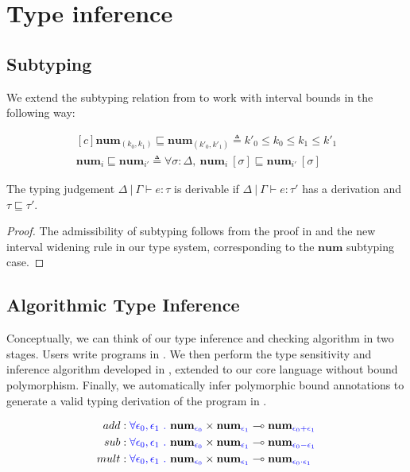 \section{Type inference}

\subsection{Subtyping}
We extend the subtyping relation from \cite{NumFuzz} to work with interval
bounds in the following way:

$$
\begin{aligned}[c]
\textbf{num}_{(k_0, k_1)} \sqsubseteq \textbf{num}_{(k'_0, k'_1)} \triangleq 
k'_0 \leq k_0 \leq k_1 \leq k'_1 \\
\textbf{num}_{i} \sqsubseteq \textbf{num}_{i'} \triangleq 
\forall \sigma : \Delta, \
\textbf{num}_{i}~[\sigma] \sqsubseteq \textbf{num}_{i'}~[\sigma]
\end{aligned}
$$

\begin{theorem}
  The typing judgement $\Delta \ | \ \Gamma \vdash e : \tau$ is derivable if
  $\Delta \ | \ \Gamma \vdash e : \tau'$ has a derivation and $\tau \sqsubseteq
  \tau'$.
\end{theorem}
\begin{proof}
  The admissibility of subtyping follows from the proof in \cite{NumFuzz} and the
new interval widening rule in our type system, corresponding to the
$\textbf{num}$ subtyping case.
\end{proof}

\subsection{Algorithmic Type Inference}

Conceptually, we can think of our type inference and checking algorithm in two
stages. Users write programs in \Lang. We then perform the type sensitivity and
inference algorithm developed in \cite{NumFuzz}, extended to our core language
without bound polymorphism. Finally, we automatically infer polymorphic bound
annotations to generate a valid typing derivation of the program in \bnd{\Lang}.

\begin{equation}
  \begin{aligned}[c]
    add &: \textcolor{blue}{\forall \epsilon_0, \epsilon_1 \ .} \
    \textbf{num}_{\textcolor{blue}{\epsilon_0}} \times \textbf{num}_{\textcolor{blue}{\epsilon_1}}
    \multimap \textbf{num}_{\textcolor{blue}{\epsilon_0 + \epsilon_1}} \\
    sub &: \textcolor{blue}{\forall \epsilon_0, \epsilon_1 \ .} \
    \textbf{num}_{\textcolor{blue}{\epsilon_0}} \times \textbf{num}_{\textcolor{blue}{\epsilon_1}}
    \multimap \textbf{num}_{\textcolor{blue}{\epsilon_0 - \epsilon_1}} \\
    mult &: \textcolor{blue}{\forall \epsilon_0, \epsilon_1 \ .} \
    \textbf{num}_{\textcolor{blue}{\epsilon_0}} \times \textbf{num}_{\textcolor{blue}{\epsilon_1}}
    \multimap \textbf{num}_{\textcolor{blue}{\epsilon_0 \cdot \epsilon_1}} \\
  \end{aligned}
\end{equation}

